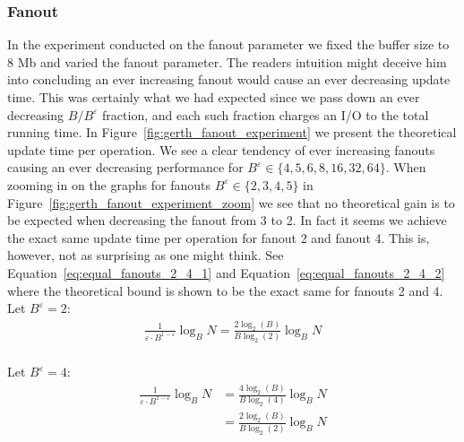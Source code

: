 \documentclass[twoside,11pt,openright]{report}
\def \epsilon {\varepsilon}
\newcommand{\todo}[1]{{\color[rgb]{.5,0,0}\textbf{$\blacktriangleright$#1$\blacktriangleleft$}}}
\begin{document}
\clearpage

\subsubsection*{Fanout}
In the experiment conducted on the fanout parameter we fixed the buffer size to 8 Mb and varied the fanout parameter. The readers intuition might deceive him into concluding an ever increasing fanout would cause an ever decreasing update time. This was certainly what we had expected since we pass down an ever decreasing $B / B^\epsilon$ fraction, and each such fraction charges an I/O to the total running time. In Figure~\ref{fig:gerth_fanout_experiment} we present the theoretical update time per operation. We see a clear tendency of ever increasing fanouts causing an ever decreasing performance for $B^\epsilon \in \{4, 5, 6, 8, 16, 32, 64 \}$. When zooming in on the graphs for fanouts $B^\epsilon \in \{2, 3, 4, 5\}$ in Figure~\ref{fig:gerth_fanout_experiment_zoom} we see that no theoretical gain is to be expected when decreasing the fanout from 3 to 2. In fact it seems we achieve the exact same update time per operation for fanout 2 and fanout 4. This is, however, not as surprising as one might think. See Equation~\ref{eq:equal_fanouts_2_4_1} and Equation~\ref{eq:equal_fanouts_2_4_2} where the theoretical bound is shown to be the exact same for fanouts 2 and 4.\\

Let $B^\epsilon = 2$:
\begin{equation} \label{eq:equal_fanouts_2_4_1}
	\begin{split}
		\frac{1}{\epsilon \cdot B^{1-\epsilon}}\log_B N = \frac{2\log_2(B)}{B\log_2(2)}\log_B N \\
	\end{split}
\end{equation}

Let $B^\epsilon = 4$:
\begin{equation} \label{eq:equal_fanouts_2_4_2}
	\begin{split}
		\frac{1}{\epsilon \cdot B^{1-\epsilon}}\log_B N & = \frac{4\log_2(B)}{B\log_2(4)}\log_B N \\
		& = \frac{2\log_2(B)}{B\log_2(2)}\log_B N
	\end{split}
\end{equation}

\end{document}
